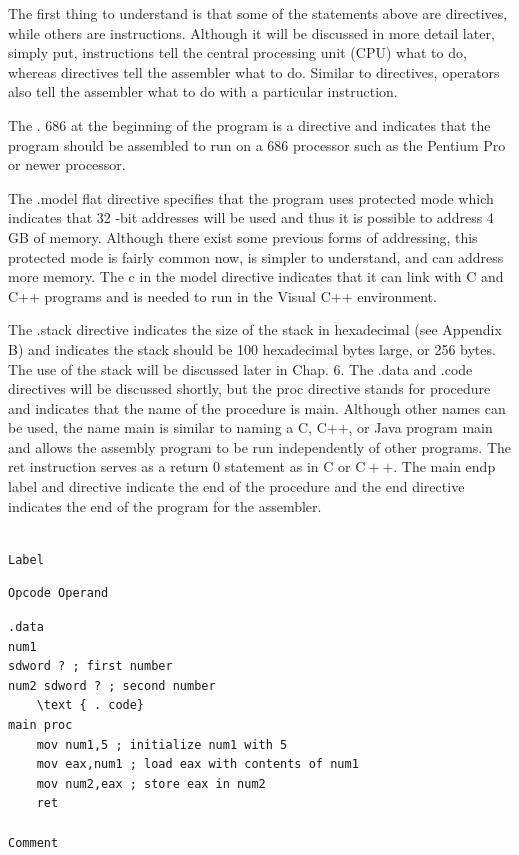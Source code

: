 \documentclass[10pt]{article}
\begin{document}
The first thing to understand is that some of the statements above are directives, while others are instructions. Although it will be discussed in more detail later, simply put, instructions tell the central processing unit (CPU) what to do, whereas directives tell the assembler what to do. Similar to directives, operators also tell the assembler what to do with a particular instruction.

The . 686 at the beginning of the program is a directive and indicates that the program should be assembled to run on a 686 processor such as the Pentium Pro or newer processor.

The .model flat directive specifies that the program uses protected mode which indicates that 32 -bit addresses will be used and thus it is possible to address 4 GB of memory. Although there exist some previous forms of addressing, this protected mode is fairly common now, is simpler to understand, and can address more memory. The c in the model directive indicates that it can link with C and C++ programs and is needed to run in the Visual C++ environment.

The .stack directive indicates the size of the stack in hexadecimal (see Appendix B) and indicates the stack should be 100 hexadecimal bytes large, or 256 bytes. The use of the stack will be discussed later in Chap. 6. The .data and .code directives will be discussed shortly, but the proc directive stands for procedure and indicates that the name of the procedure is main. Although other names can be used, the name main is similar to naming a C, C++, or Java program main and allows the assembly program to be run independently of other programs. The ret instruction serves as a return 0 statement as in C or $\mathrm{C}++$. The main endp label and directive indicate the end of the procedure and the end directive indicates the end of the program for the assembler.

\begin{verbatim}

Label
\end{verbatim}

\begin{verbatim}
Opcode Operand
\end{verbatim}

\begin{verbatim}
.data
num1
sdword ? ; first number
num2 sdword ? ; second number
    \text { . code}
main proc
    mov num1,5 ; initialize num1 with 5
    mov eax,num1 ; load eax with contents of num1
    mov num2,eax ; store eax in num2
    ret

Comment
\end{verbatim}
\end{document}
